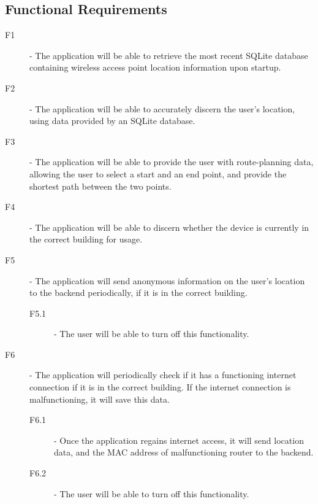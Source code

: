 \documentclass[11pt]{informatics-report}
\begin{document}
\subsection{Functional Requirements}
\begin{description}
\item[F1] - The application will be able to retrieve the most recent SQLite database containing wireless access point location information upon startup.
\item[F2] - The application will be able to accurately discern the user's location, using data provided by an SQLite database.
\item[F3] - The application will be able to provide the user with route-planning data, allowing the user to select a start and an end point, and provide the shortest path between the two points.
\item[F4] - The application will be able to discern whether the device is currently in the correct building for usage.
\item[F5] - The application will send anonymous information on the user's location to the backend periodically, if it is in the correct building.
	\begin{description}
	\item[F5.1] - The user will be able to turn off this functionality.
	\end{description}
\item[F6] - The application will periodically check if it has a functioning internet connection if it is in the correct building. If the internet connection is malfunctioning, it will save this data.
	\begin{description}
	\item[F6.1] - Once the application regains internet access, it will send location data, and the MAC address of malfunctioning router to the backend.
	\item[F6.2] - The user will be able to turn off this functionality.
	\end{description}
\end{description}
\end{document}
